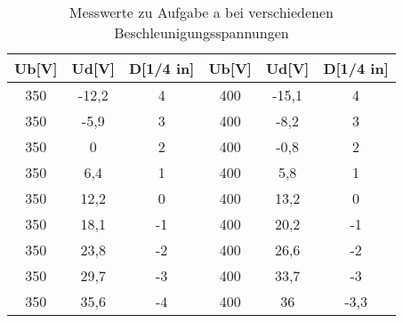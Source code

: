 \begin{table}[h]
\begin{center}
\begin{tabular}{c|c|c||c|c|c}
Ub[V] & Ud[V] & D[1/4 in] & Ub[V] & Ud[V] & D[1/4 in] \\
\hline
350 & -12,2 & 4 & 400 & -15,1 & 4 \\
350 & -5,9 & 3 & 400 & -8,2 & 3 \\
350 & 0 & 2 & 400 & -0,8 & 2 \\
350 & 6,4 & 1 & 400 & 5,8 & 1 \\
350 & 12,2 & 0 & 400 & 13,2 & 0 \\
350 & 18,1 & -1 & 400 & 20,2 & -1 \\
350 & 23,8 & -2 & 400 & 26,6 & -2 \\
350 & 29,7 & -3 & 400 & 33,7 & -3 \\
350 & 35,6 & -4 & 400 & 36 & -3,3 \\
\end{tabular}
\caption{Messwerte zu Aufgabe a bei verschiedenen Beschleunigungsspannungen}
\label{tabelle_2}
\end{center}
\end{table}
